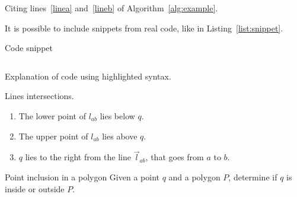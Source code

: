 \documentclass[a4paper, 12pt]{article}
\begin{document}
Citing lines~\ref{linea} and~\ref{lineb} of Algorithm~\ref{alg:example}.

It is possible to include snippets from real code, like in Listing~\ref{list:snippet}.

\begin{listing}[hbf!]
  \caption{Code snippet}
  \label{list:snippet}
  \inputminted{cpp}{./snippets/hello.cpp}
\end{listing}

Explanation of code using highlighted syntax.


\begin{definition}{Lines intersections.}
\begin{enumerate}
  \item The lower point of $l_{ab}$ lies below $q$.
  \item The upper point of $l_{ab}$ lies above $q$.
  \item $q$ lies to the right from the line $\overrightarrow{l}_{ab}$, that
      goes from $a$ to $b$.
\end{enumerate}
\end{definition}

\begin{problem}{Point inclusion in a polygon}
Given a point $q$ and a polygon $P$, determine if $q$ is inside or outside $P$.
\end{problem}
\end{document}

